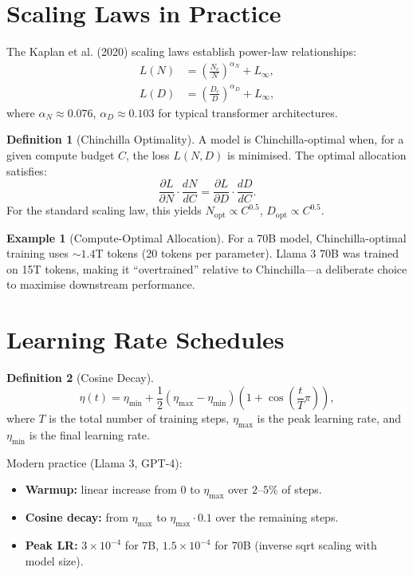 \documentclass[11pt,a4paper]{book}
\theoremstyle{definition}
\newtheorem{definition}{Definition}[chapter]
\newtheorem{example}{Example}[chapter]
\begin{document}
\section{Scaling Laws in Practice}

The Kaplan et al. (2020) scaling laws establish power-law relationships:
\begin{align}
	L(N) & = \left(\frac{N_c}{N}\right)^{\alpha_N} + L_\infty, \\
	L(D) & = \left(\frac{D_c}{D}\right)^{\alpha_D} + L_\infty,
\end{align}
where $\alpha_N \approx 0.076$, $\alpha_D \approx 0.103$ for typical transformer architectures.

\begin{definition}[Chinchilla Optimality]
	A model is Chinchilla-optimal when, for a given compute budget $C$, the loss $L(N, D)$ is minimised. The optimal allocation satisfies:
	\begin{equation}
		\frac{\partial L}{\partial N} \cdot \frac{dN}{dC} = \frac{\partial L}{\partial D} \cdot \frac{dD}{dC}.
	\end{equation}
	For the standard scaling law, this yields $N_\text{opt} \propto C^{0.5}$, $D_\text{opt} \propto C^{0.5}$.
\end{definition}

\begin{example}[Compute-Optimal Allocation]
	For a 70B model, Chinchilla-optimal training uses $\sim 1.4$T tokens (20 tokens per parameter). Llama 3 70B was trained on 15T tokens, making it ``overtrained'' relative to Chinchilla---a deliberate choice to maximise downstream performance.
\end{example}

\section{Learning Rate Schedules}

\begin{definition}[Cosine Decay]
	\begin{equation}
		\eta(t) = \eta_{\min} + \frac{1}{2}(\eta_{\max} - \eta_{\min})\left(1 + \cos\left(\frac{t}{T}\pi\right)\right),
	\end{equation}
	where $T$ is the total number of training steps, $\eta_{\max}$ is the peak learning rate, and $\eta_{\min}$ is the final learning rate.
\end{definition}

Modern practice (Llama 3, GPT-4):
\begin{itemize}
	\item \textbf{Warmup:} linear increase from $0$ to $\eta_{\max}$ over $2$--$5\%$ of steps.
	\item \textbf{Cosine decay:} from $\eta_{\max}$ to $\eta_{\max} \cdot 0.1$ over the remaining steps.
	\item \textbf{Peak LR:} $3\times 10^{-4}$ for 7B, $1.5\times 10^{-4}$ for 70B (inverse sqrt scaling with model size).
\end{itemize}
\end{document}
